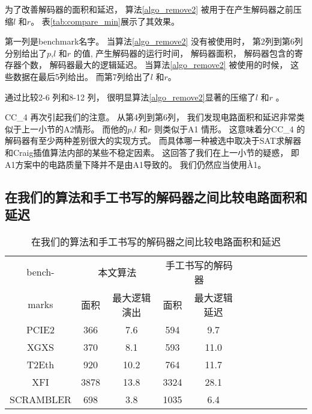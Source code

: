 为了改善解码器的面积和延迟，
算法\ref{algo_remove2} 被用于在产生解码器之前压缩$l$ 和$r$。
表\ref{tab:compare_min}展示了其效果。

第一列是benchmark名字。
当算法\ref{algo_remove2} 没有被使用时，
第2列到第6列分别给出了$p$,$l$ 和$r$ 的值,
产生解码器的运行时间，
解码器面积，
解码器包含的寄存器个数，
解码器最大的逻辑延迟。
当算法\ref{algo_remove2} 被使用的时候，
这些数据在最后5列给出。
而第7列给出了$l$ 和$r$。

通过比较2-6 列和8-12 列，
很明显算法\ref{algo_remove2}显著的压缩了$l$ 和$r$ 。

CC\_4 再次引起我们的注意。
从第4列到第6列，
我们发现电路面积和延迟非常类似于上一小节的A2情形。
而他的$p$,$l$ 和$r$ 则类似于A1 情形。
这意味着分CC\_4 的解码器有至少两种差别很大的实现方式。
而具体哪一种被选中取决于SAT求解器和Craig插值算法内部的某些不稳定因素。
这回答了我们在上一小节的疑惑，
即A1方案中的电路质量下降并不是由A1导致的。
我们仍然应当使用À1。


\subsection{在我们的算法和手工书写的解码器之间比较电路面积和延迟}\label{subsec_compareman}

\begin{table}[b]%
\caption{在我们的算法和手工书写的解码器之间比较电路面积和延迟}
\label{tab:comparing_hand}
\begin{tabular}{|c|c|c|c|c|c|c|c|c|c|c|c|}
\hline
bench-   & \multicolumn{2}{|c|}{本文算法} &  \multicolumn{2}{|c|}{手工书写的解码器} \\\cline{2-5}
marks    & 面积    & 最大逻辑演出       &面积    & 最大逻辑延迟\\\hline
PCIE2    & 366     &7.6                 & 594    & 9.7                              \\\hline
XGXS     & 370     &8.1                 & 593    & 11.0                             \\\hline
T2Eth    & 920     &10.2                & 764    & 11.7                             \\\hline
XFI      & 3878    & 13.8               & 3324   & 28.1                             \\\hline
SCRAMBLER& 698     & 3.8                & 1035   & 6.4                              \\\hline
\end{tabular}
\end{table}%

